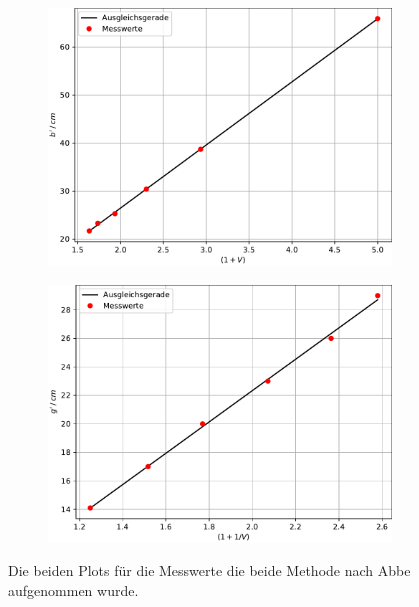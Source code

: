 \begin{figure}
    \centering
    \begin{subfigure}{0.48\textwidth}
        \centering
        \includegraphics[width=\textwidth]{content/data/plot_abbe_b.pdf}
    \end{subfigure}
    \begin{subfigure}{0.48\textwidth}
        \includegraphics[width=\textwidth]{content/data/plot_abbe_g.pdf}
    \end{subfigure}
    \caption{Die beiden Plots für die Messwerte die beide Methode nach Abbe aufgenommen wurde.}
    \label{fig:abbe}
\end{figure}

